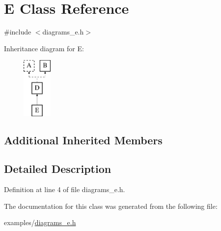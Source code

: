 \hypertarget{class_e}{}\section{E Class Reference}
\label{class_e}


{\ttfamily \#include $<$diagrams\+\_\+e.\+h$>$}

Inheritance diagram for E\+:\begin{figure}[H]
\begin{center}
\leavevmode
\includegraphics[height=3.000000cm]{class_e}
\end{center}
\end{figure}
\subsection*{Additional Inherited Members}


\subsection{Detailed Description}


Definition at line 4 of file diagrams\+\_\+e.\+h.



The documentation for this class was generated from the following file\+:\begin{DoxyCompactItemize}
\item 
examples/\hyperlink{diagrams__e_8h}{diagrams\+\_\+e.\+h}\end{DoxyCompactItemize}
